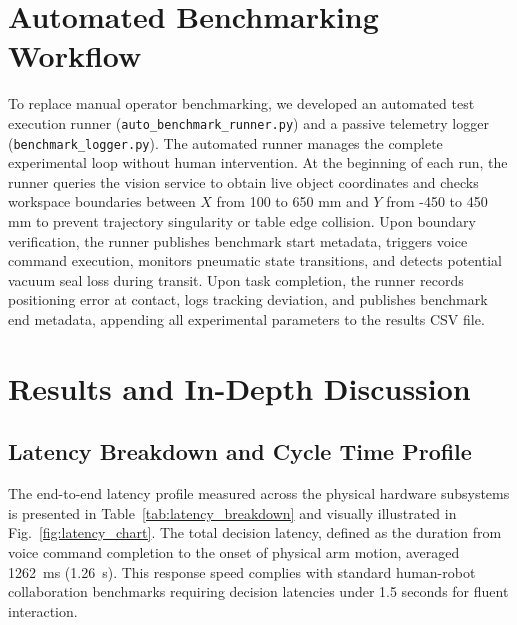 \documentclass[runningheads]{llncs}
\begin{document}
\section{Automated Benchmarking Workflow}
\label{sec:benchmark_workflow}

To replace manual operator benchmarking, we developed an automated test execution runner (\texttt{auto\_benchmark\_runner.py}) and a passive telemetry logger (\texttt{benchmark\_logger.py}). The automated runner manages the complete experimental loop without human intervention. At the beginning of each run, the runner queries the vision service to obtain live object coordinates and checks workspace boundaries between $X$ from 100 to 650 mm and $Y$ from -450 to 450 mm to prevent trajectory singularity or table edge collision. Upon boundary verification, the runner publishes benchmark start metadata, triggers voice command execution, monitors pneumatic state transitions, and detects potential vacuum seal loss during transit. Upon task completion, the runner records positioning error at contact, logs tracking deviation, and publishes benchmark end metadata, appending all experimental parameters to the results CSV file.

\section{Results and In-Depth Discussion}
\label{sec:results}

\subsection{Latency Breakdown and Cycle Time Profile}
The end-to-end latency profile measured across the physical hardware subsystems is presented in Table~\ref{tab:latency_breakdown} and visually illustrated in Fig.~\ref{fig:latency_chart}. The total decision latency, defined as the duration from voice command completion to the onset of physical arm motion, averaged \SI{1262}{\milli\second} (\SI{1.26}{\second}). This response speed complies with standard human-robot collaboration benchmarks requiring decision latencies under 1.5 seconds for fluent interaction.
\end{document}
